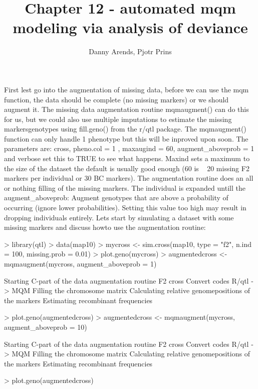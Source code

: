 \documentclass[a4paper]{article}
\title { Chapter 12 - automated mqm modeling via analysis of deviance }
\author { Danny Arends, Pjotr Prins }
\begin{document}
\maketitle
First lest go into the augmentation of missing data, before we can use the mqm function, the data should be complete (no missing markers)
or we should augment it. The missing data augmentation routine mqmaugment() can do this for us, but we could also use multiple imputations
to estimate the missing markersgenotypes using fill.geno() from the r/qtl package. The mqmaugment() function can only handle 1 phenotype but this will be inproved upon soon. The parameters  are:
cross, pheno.col = 1 , maxaugind = 60, augment_aboveprob = 1 and verbose set this to TRUE to see what happens. Maxind sets a maximum to the size of the dataset the default is usually good enough (60 is ~ 20 missing F2 markers per individual or 30 BC markers). The augmentation routine does an all or nothing filling of the missing markers. The individual is expanded untill the augment_aboveprob: Augment genotypes that are above a probability of occurring (ignore lower probabilities). Setting this value too high may result in dropping individuals entirely.
Lets start by simulating a dataset with some missing markers and discuss howto use the augmentation routine:
\begin{Schunk}
\begin{Sinput}
> library(qtl)
> data(map10)
> mycross <- sim.cross(map10, type = "f2", n.ind = 100, missing.prob = 0.01)
> plot.geno(mycross)
> augmentedcross <- mqmaugment(mycross, augment_aboveprob = 1)
\end{Sinput}
\begin{Soutput}
Starting C-part of the data augmentation routine
F2 cross
Convert codes R/qtl -> MQM
Filling the chromosome matrix
Calculating relative genomepositions of the markers
Estimating recombinant frequencies
\end{Soutput}
\begin{Sinput}
> plot.geno(augmentedcross)
> augmentedcross <- mqmaugment(mycross, augment_aboveprob = 10)
\end{Sinput}
\begin{Soutput}
Starting C-part of the data augmentation routine
F2 cross
Convert codes R/qtl -> MQM
Filling the chromosome matrix
Calculating relative genomepositions of the markers
Estimating recombinant frequencies
\end{Soutput}
\begin{Sinput}
> plot.geno(augmentedcross)
\end{Sinput}
\end{Schunk}
\end{document}
